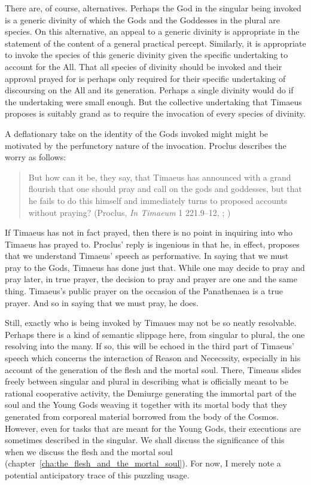 There are, of course, alternatives. Perhaps the God in the singular being invoked is a generic divinity of which the Gods and the Goddesses in the plural are species. On this alternative, an appeal to a generic divinity is appropriate in the statement of the content of a general practical percept. Similarly, it is appropriate to invoke the species of this generic divinity given the specific undertaking to account for the All. That all species of divinity should be invoked and their approval prayed for is perhaps only required for their specific undertaking of discoursing on the All and its generation. Perhaps a single divinity would do if the undertaking were small enough. But the collective undertaking that Timaeus proposes is suitably grand as to require the invocation of every species of divinity.

A deflationary take on the identity of the Gods invoked might might be motivated by the perfunctory nature of the invocation. Proclus describes the worry as follows:
\begin{quote}
	But how can it be, they say, that Timaeus has announced with a grand flourish that one should pray and call on the gods and goddesses, but that he fails to do this himself and immediately turns to proposed accounts without praying? (Proclus, \emph{In Timaeum} 1 221.9--12, \citealt{Diehl:1903re}; \citealt[58]{Runia:2008aa})
\end{quote}
If Timaeus has not in fact prayed, then there is no point in inquiring into who Timaeus has prayed to. Proclus' reply is ingenious in that he, in effect, proposes that we understand Timaeus' speech as performative. In saying that we must pray to the Gods, Timaeus has done just that. While one may decide to pray and pray later, in true prayer, the decision to pray and prayer are one and the same thing. Timaeus's public prayer on the occasion of the Panathenaea is a true prayer. And so in saying that we must pray, he does.

Still, exactly who is being invoked by Timaues may not be so neatly resolvable. Perhaps there is a kind of semantic slippage here, from singular to plural, the one resolving into the many. If so, this will be echoed in the third part of Timaeus' speech which concerns the interaction of Reason and Nececssity, especially in his account of the generation of the flesh and the mortal soul. There, Timeaus slides freely between singular and plural in describing what is officially meant to be rational cooperative activity, the Demiurge generating the immortal part of the soul and the Young Gods weaving it together with its mortal body that they generated from corporeal material borrowed from the body of the Cosmos. However, even for tasks that are meant for the Young Gods, their executions are sometimes described in the singular. We shall discuss the significance of this when we discuss the flesh and the mortal soul (chapter~\ref{cha:the_flesh_and_the_mortal_soul}). For now, I merely note a potential anticipatory trace of this puzzling usage. 

